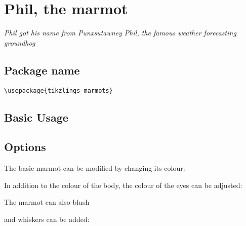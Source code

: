 \documentclass[parskip=half]{scrartcl}
\begin{document}
%
%
\clearpage
\section[Marmot]{Phil, the marmot}

\emph{Phil got his name from Punxsutawney Phil, the famous weather forecasting groundhog}

\subsection{Package name}

\begin{tcolorbox}[lower separated=false, lefthand width=.8\linewidth]
\vspace*{0.5cm}
\lstinline|\usepackage{tikzlings-marmots}| 
\vspace*{0.5cm}
\end{tcolorbox}

\subsection{Basic Usage}

\begin{tcblisting}{}
\marmot
\end{tcblisting}

\subsection{Options}

The basic marmot can be modified by changing its colour:
\begin{tcblisting}{}
\marmot[body=blue]
\end{tcblisting}

In addition to the colour of the body, the colour of the eyes can be adjusted:
\begin{tcblisting}{}
\marmot[eye=red]
\end{tcblisting}

The marmot can also blush
\begin{tcblisting}{}
\marmot[blush]
\end{tcblisting}

and whiskers can be added:
\begin{tcblisting}{}
\marmot[whiskers=gray]
\end{tcblisting}
\end{document}
